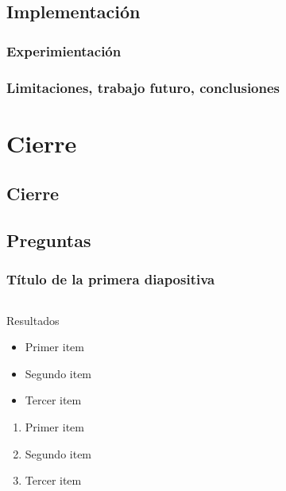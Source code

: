 \documentclass{beamer}
\begin{document}
\subsection{Implementación}
\subsubsection*{Experimientación}
\subsubsection*{Limitaciones, trabajo futuro, conclusiones}
\section{Cierre}
  \subsection*{Cierre}
  \subsection*{Preguntas}

\begin{frame}
    \frametitle{Título de la primera diapositiva}
\begin{columns}
 \begin{column}{0.55\textwidth}
\begin{block}{Resultados}
    \begin{itemize}[<+->]
      \item  Primer item
      \item  Segundo item
      \item  Tercer item
    \end{itemize}
    \begin{enumerate}[<+-| alert@+>]
      \item  Primer item
      \item  Segundo item
      \item  Tercer item
    \end{enumerate}
\end{block}
 \end{column} \ \
\end{columns}
\end{frame}
\end{document}
